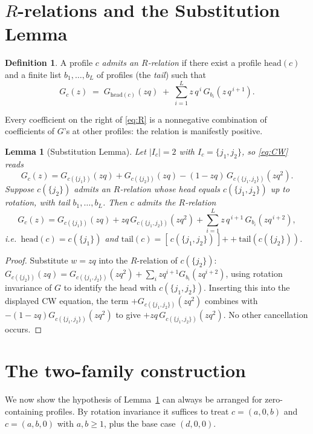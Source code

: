 \documentclass[11pt]{article}
\newtheorem{lemma}[theorem]{Lemma}
\theoremstyle{definition}
\newtheorem{definition}[theorem]{Definition}
\begin{document}
\section{$R$-relations and the Substitution Lemma}

\begin{definition}
A profile $c$ \emph{admits an $R$-relation} if there exist a profile $\mathrm{head}(c)$
and a finite list $b_1,\dots,b_L$ of profiles (the \emph{tail}) such that
\begin{equation}\label{eq:R}
G_c(z) \;=\; G_{\mathrm{head}(c)}(zq) \;+\; \sum_{i=1}^{L} z\,q^{\,i}\,
G_{b_i}(z\,q^{\,i+1}).
\end{equation}
\end{definition}
Every coefficient on the right of \eqref{eq:R} is a nonnegative combination of
coefficients of $G$'s at other profiles: the relation is manifestly positive.

\begin{lemma}[Substitution Lemma]\label{lem:sub}
Let $|I_c|=2$ with $I_c=\{j_1,j_2\}$, so \eqref{eq:CW} reads
\[
G_c(z) = G_{c(\{j_1\})}(zq) + G_{c(\{j_2\})}(zq) - (1-zq)\,G_{c(\{j_1,j_2\})}(zq^2).
\]
Suppose $c(\{j_2\})$ admits an $R$-relation whose head equals $c(\{j_1,j_2\})$ up to
rotation, with tail $b_1,\dots,b_L$. Then $c$ admits the $R$-relation
\[
G_c(z) = G_{c(\{j_1\})}(zq) + zq\,G_{c(\{j_1,j_2\})}(zq^2)
+ \sum_{i=1}^{L} z\,q^{\,i+1}\, G_{b_i}(zq^{\,i+2}),
\]
i.e.\ $\mathrm{head}(c)=c(\{j_1\})$ and $\mathrm{tail}(c) = [\,c(\{j_1,j_2\})\,]
\mathbin{+\!\!+} \mathrm{tail}(c(\{j_2\}))$.
\end{lemma}

\begin{proof}
Substitute $w=zq$ into the $R$-relation of $c(\{j_2\})$:
$G_{c(\{j_2\})}(zq) = G_{c(\{j_1,j_2\})}(zq^2) + \sum_i zq^{i+1} G_{b_i}(zq^{i+2})$,
using rotation invariance of $G$ to identify the head with $c(\{j_1,j_2\})$.
Inserting this into the displayed CW equation, the term $+G_{c(\{j_1,j_2\})}(zq^2)$
combines with $-(1-zq)G_{c(\{j_1,j_2\})}(zq^2)$ to give $+zq\,G_{c(\{j_1,j_2\})}(zq^2)$.
No other cancellation occurs.
\end{proof}

\section{The two-family construction}

We now show the hypothesis of Lemma~\ref{lem:sub} can always be arranged for
zero-containing profiles. By rotation invariance it suffices to treat
$c=(a,0,b)$ and $c=(a,b,0)$ with $a,b\ge 1$, plus the base case $(d,0,0)$.
\end{document}
